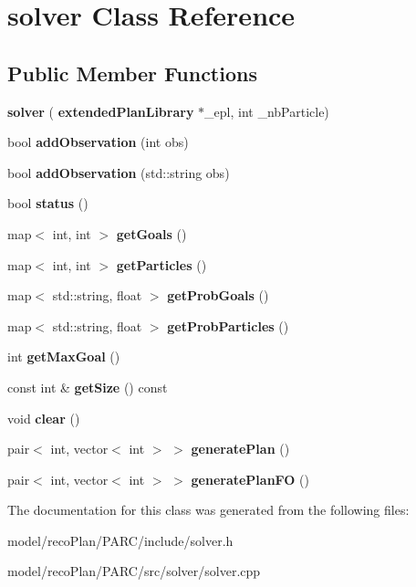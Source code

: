 \section{solver Class Reference}
\label{classsolver}
\subsection*{Public Member Functions}
\begin{DoxyCompactItemize}
\item 
\mbox{\label{classsolver_a8ec9903435c8e17381aad968f0539003}} 
{\bfseries solver} (\textbf{ extended\+Plan\+Library} $\ast$\+\_\+epl, int \+\_\+nb\+Particle)
\item 
\mbox{\label{classsolver_ad3330e122355d5243387d0a92fc04978}} 
bool {\bfseries add\+Observation} (int obs)
\item 
\mbox{\label{classsolver_a041206bc0d3b165a141b24dfe8e0b90d}} 
bool {\bfseries add\+Observation} (std\+::string obs)
\item 
\mbox{\label{classsolver_a8eca9e760991959fc71913fd5987f886}} 
bool {\bfseries status} ()
\item 
\mbox{\label{classsolver_a18051200fe6815673e8a54822b726f97}} 
map$<$ int, int $>$ {\bfseries get\+Goals} ()
\item 
\mbox{\label{classsolver_ae1ba892ffdca41c210c34eadd84b19b5}} 
map$<$ int, int $>$ {\bfseries get\+Particles} ()
\item 
\mbox{\label{classsolver_a5f16741d3a28994464faa54280c98efa}} 
map$<$ std\+::string, float $>$ {\bfseries get\+Prob\+Goals} ()
\item 
\mbox{\label{classsolver_a93b69fb6a44494697a805d3b320c574c}} 
map$<$ std\+::string, float $>$ {\bfseries get\+Prob\+Particles} ()
\item 
\mbox{\label{classsolver_a96f03ffec3cba4c72fd83ae6ffd02f5c}} 
int {\bfseries get\+Max\+Goal} ()
\item 
\mbox{\label{classsolver_ace7514165a3e96c444392f53cd9b5ef4}} 
const int \& {\bfseries get\+Size} () const
\item 
\mbox{\label{classsolver_a10f3e831fbffb0ca926e3eedb840943e}} 
void {\bfseries clear} ()
\item 
\mbox{\label{classsolver_a7a4dcd1caf3438bc1a208aa3cb6ca2b2}} 
pair$<$ int, vector$<$ int $>$ $>$ {\bfseries generate\+Plan} ()
\item 
\mbox{\label{classsolver_a854e71f54847aa138ed08559873ad182}} 
pair$<$ int, vector$<$ int $>$ $>$ {\bfseries generate\+Plan\+FO} ()
\end{DoxyCompactItemize}


The documentation for this class was generated from the following files\+:\begin{DoxyCompactItemize}
\item 
model/reco\+Plan/\+P\+A\+R\+C/include/solver.\+h\item 
model/reco\+Plan/\+P\+A\+R\+C/src/solver/solver.\+cpp\end{DoxyCompactItemize}
